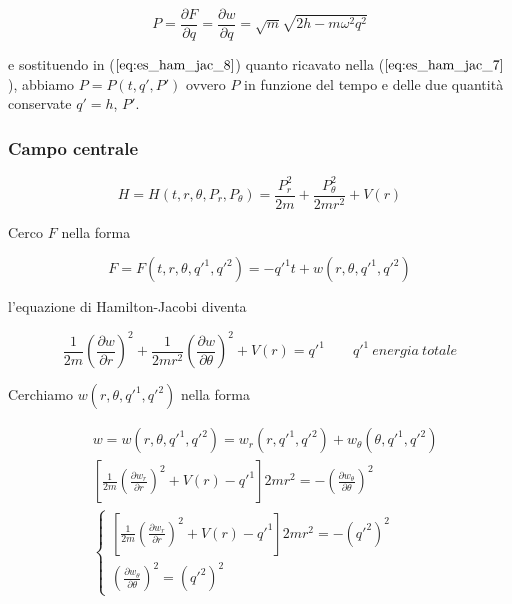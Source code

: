 \begin{equation} \label{eq:es_ham_jac_8}
P = \frac{\partial F}{\partial q} = \frac{\partial w}{\partial q} = \sqrt{m} \sqrt{2h - m \omega^2 q^2}
\end{equation}

e sostituendo in ($ \ref{eq:es_ham_jac_8} $) quanto ricavato nella ($ \ref{eq:es_ham_jac_7} $), abbiamo $P = P (t, q', P')$ ovvero $P$ in funzione del tempo e delle due quantità conservate $q' = h$, $P'$.

\subsubsection*{Campo centrale}

\begin{equation}
H = H (t, r, \theta, P_r, P_\theta) = \frac{P_r^2}{2m} + \frac{P_\theta^2}{2mr^2} + V(r)
\end{equation}

Cerco $ F $ nella forma

\begin{equation*}
 F = F (t, r, \theta, q'^1, q'^2) = - q'^1 t + w (r, \theta, q'^1, q'^2)
\end{equation*}

l'equazione di Hamilton-Jacobi diventa

\begin{equation*}
\frac{1}{2m} \left( \frac{\partial w}{\partial r} \right)^2 + \frac{1}{2mr^2} \left( \frac{\partial w}{\partial \theta} \right)^2 + V(r) = q'^1 \qquad q'^1~energia~totale
\end{equation*}

Cerchiamo $ w (r, \theta, q'^1, q'^2) $ nella forma

\begin{equation*}
\begin{split}
& w = w (r, \theta, q'^1, q'^2) = w_r(r, q'^1, q'^2) + w_\theta(\theta, q'^1, q'^2) \\
& \left[ \frac{1}{2m} \left( \frac{\partial w_r}{\partial r} \right)^2 + V(r) - q'^1 \right] 2mr^2 = -\left( \frac{\partial w_\theta}{\partial \theta} \right)^2 \\
& \begin{cases}\left[ \frac{1}{2m} \left( \frac{\partial w_r}{\partial r} \right)^2 + V(r) - q'^1 \right] 2mr^2 = -\left( q'^2 \right)^2 \\
\left( \frac{\partial w_\theta}{\partial \theta} \right)^2 =  \left( q'^2 \right)^2
\end{cases}
\end{split}
\end{equation*}

